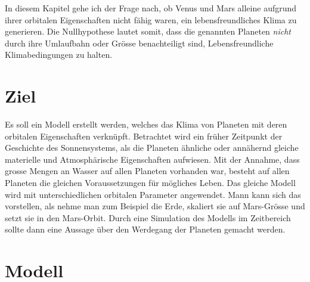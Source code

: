 \begin{refsection}
In diesem Kapitel gehe ich der Frage nach, ob Venus und Mars alleine aufgrund ihrer orbitalen Eigenschaften nicht fähig waren, ein lebensfreundliches Klima zu generieren. Die Nullhypothese lautet somit, dass die genannten Planeten \textit{nicht} durch ihre Umlaufbahn oder Grösse benachteiligt sind, Lebensfreundliche Klimabedingungen zu halten.



\section{Ziel}
Es soll ein Modell erstellt werden, welches das Klima von Planeten mit deren orbitalen Eigenschaften verknüpft.
Betrachtet wird ein früher Zeitpunkt der Geschichte des Sonnensystems, als die Planeten ähnliche oder annähernd gleiche materielle und Atmosphärische Eigenschaften aufwiesen.
Mit der Annahme, dass grosse Mengen an Wasser auf allen Planeten vorhanden war, besteht auf allen Planeten die gleichen Voraussetzungen für mögliches Leben.
Das gleiche Modell wird mit unterschiedlichen orbitalen Parameter angewendet. Mann kann sich das vorstellen, als nehme man zum Beispiel die Erde, skaliert sie auf Mars-Grösse und setzt sie in den Mars-Orbit. 
Durch eine Simulation des Modells im Zeitbereich sollte dann eine Aussage über den Werdegang der Planeten gemacht werden.




%
%
%

\section{Modell}



\end{refsection}
